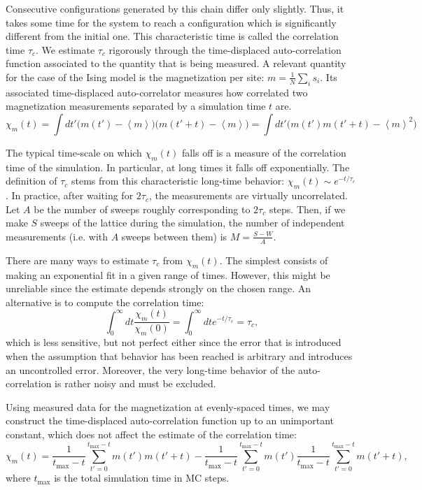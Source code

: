 Consecutive configurations generated by this chain differ only slightly.
Thus, it takes some time for the system to reach a configuration which is significantly different from the initial one.
This characteristic time is called the correlation time $\tau_c$.
We estimate $\tau_c$ rigorously through the time-displaced auto-correlation function associated to the quantity that is being measured.
A relevant quantity for the case of the Ising model is the magnetization per site:
$
m = \frac{1}{N} \sum_i s_i
$.
Its associated time-displaced auto-correlator measures how correlated two magnetization measurements separated by a simulation time $t$ are.
\begin{equation}
\chi_m ( t ) = \int dt' \big( m ( t' ) - \left\langle m \right\rangle \big) \big( m ( t' + t ) - \left\langle m \right\rangle \big) = \int dt' \big( m ( t' ) m ( t' + t ) - \left\langle m \right\rangle^2 \big)
\end{equation}

The typical time-scale on which $\chi_m (t)$ falls off is a measure of the correlation time of the simulation.
In particular, at long times it falls off exponentially.
The definition of $\tau_c$ stems from this characteristic long-time behavior: $\chi_m (t) \sim e^{-t / \tau_c}$.
In practice, after waiting for $2\tau_c$, the measurements are virtually uncorrelated.
Let $A$ be the number of sweeps roughly  corresponding to $2\tau_c$ steps.
Then, if we make $S$ sweeps of the lattice during the simulation, the number of independent measurements (i.e. with $A$ sweeps between them) is 
$
M = \frac{S - W}{A}
$.

There are many ways to estimate $\tau_c$ from $\chi_m (t)$.
The simplest consists of making an exponential fit in a given range of times.
However, this might be unreliable since the estimate depends strongly on the chosen range.
An alternative is to compute the  correlation time:
\begin{equation}
\int_0^\infty dt \frac{\chi_m ( t ) }{\chi_m ( 0 ) } = \int_0^\infty dt e^{-t / \tau_c} = \tau_c  ,
\end{equation}
which is less sensitive, but not perfect either since the error that is introduced when the assumption  that  behavior has been reached is arbitrary and introduces an uncontrolled error.
Moreover, the very long-time behavior of the auto-correlation is rather noisy and must be excluded.

Using measured data for the magnetization at evenly-spaced times, we may construct the time-displaced auto-correlation function up to an unimportant constant, which does not affect the estimate of the correlation time:
\begin{equation}
\chi_m (t) = \frac{1}{ t_{\text{max}} - t } \sum_{t' = 0}^{t_{\text{max}} - t } m (t') m(t' + t) - \frac{1}{ t_{\text{max}} - t } \sum_{t' = 0}^{t_{\text{max}} - t } m (t') \frac{1}{ t_{\text{max}} - t } \sum_{t' = 0}^{t_{\text{max}} - t } m(t' + t) ,
\end{equation}
where $t_{\text{max}}$ is the total simulation time in MC steps.

